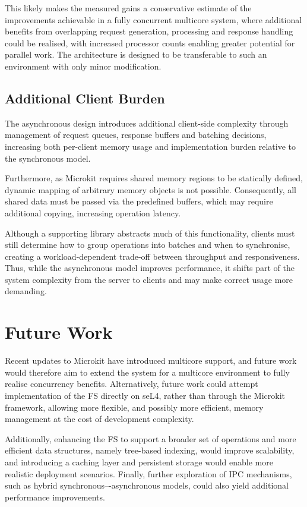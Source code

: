 This likely makes the measured gains a conservative estimate of the improvements achievable in a fully concurrent multicore system, where additional benefits from overlapping request generation, processing and response handling could be realised, with increased processor counts enabling greater potential for parallel work. The architecture is designed to be transferable to such an environment with only minor modification.

\subsection{Additional Client Burden}

The asynchronous design introduces additional client-side complexity through management of request queues, response buffers and batching decisions, increasing both per-client memory usage and implementation burden relative to the synchronous model. 

Furthermore, as Microkit requires shared memory regions to be statically defined, dynamic mapping of arbitrary memory objects is not possible. Consequently, all shared data must be passed via the predefined buffers, which may require additional copying, increasing operation latency.

\newpage
Although a supporting library abstracts much of this functionality, clients must still determine how to group operations into batches and when to synchronise, creating a workload-dependent trade-off between throughput and responsiveness. Thus, while the asynchronous model improves performance, it shifts part of the system complexity from the server to clients and may make correct usage more demanding.

\section{Future Work}

Recent updates to Microkit have introduced multicore support, and future work would therefore aim to extend the system for a multicore environment to fully realise concurrency benefits. Alternatively, future work could attempt implementation of the FS directly on seL4, rather than through the Microkit framework, allowing more flexible, and possibly more efficient, memory management at the cost of development complexity. 

Additionally, enhancing the FS to support a broader set of operations and more efficient data structures, namely tree-based indexing, would improve scalability, and introducing a caching layer and persistent storage would enable more realistic deployment scenarios. Finally, further exploration of IPC mechanisms, such as hybrid synchronous–-asynchronous models, could also yield additional performance improvements. 